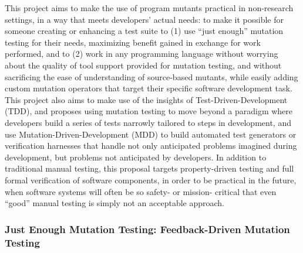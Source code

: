 This project aims to make the use of program mutants practical in non-research settings, in a way that meets developers' actual needs: to make it possible for someone creating or enhancing a test suite to (1) use ``just enough'' mutation testing for their needs, maximizing benefit gained in exchange for work performed, and to (2) work in any programming language without worrying about the quality of tool support provided for mutation testing, and without sacrificing the ease of understanding of source-based mutants, while easily adding custom mutation operators that target their specific software development task.  This project also aims to make use of the insights of Test-Driven-Development (TDD), and proposes using mutation testing to move beyond a paradigm where developers build a series of tests narrowly tailored to steps in development, and use Mutation-Driven-Development (MDD) to build automated test generators or verification harnesses that handle not only anticipated problems imagined during development, but problems not anticipated by developers.  In addition to traditional manual testing, this proposal targets property-driven testing and full formal verification of software components, in order to be practical in the future, when software systems will often be so safety- or mission- critical that even ``good'' manual testing is simply not an acceptable approach.

\subsubsection{Just Enough Mutation Testing: Feedback-Driven Mutation Testing}

